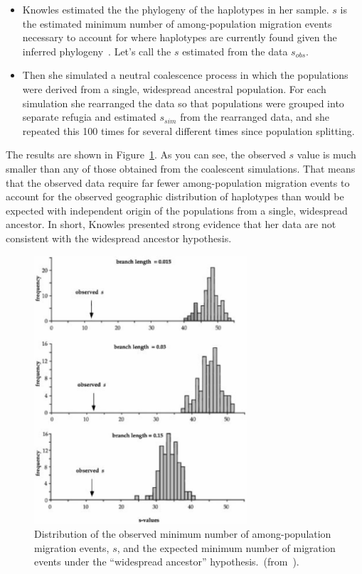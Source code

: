 \begin{itemize}

\item Knowles estimated the the phylogeny of the haplotypes in her
  sample. $s$ is the estimated minimum number of among-population
  migration events necessary to account for where haplotypes are
  currently found given the inferred
  phylogeny~\cite{Slatkin-Maddison-1989}. Let's call the $s$ estimated
  from the data $s_{obs}$.

\item Then she simulated a neutral coalescence process in which the
  populations were derived from a single, widespread ancestral
  population. For each simulation she rearranged the data so that
  populations were grouped into separate refugia and estimated $s_{sim}$
  from the rearranged data, and she repeated this 100 times for
  several different times since population splitting.

\end{itemize}

\noindent The results are shown in
Figure~\ref{fig:knowles-s-values}. As you can see, the observed $s$
value is much smaller than any of those obtained from the coalescent
simulations. That means that the observed data require far fewer
among-population migration events to account for the observed
geographic distribution of haplotypes than would be expected with
independent origin of the populations from a single, widespread
ancestor. In short, Knowles presented strong evidence that her data
are not consistent with the widespread ancestor
hypothesis.

\begin{figure}
\begin{center}
\includegraphics[height=10cm]{knowles-s-values.eps}
\end{center}
\caption{Distribution of the observed minimum number of
  among-population migration events, $s$, and the expected minimum
  number of migration events under the ``widespread ancestor''
  hypothesis.~(from~\cite{Knowles-2001}).}\label{fig:knowles-s-values}
\end{figure}

